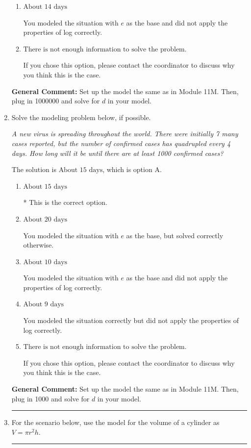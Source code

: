 \documentclass{extbook}[14pt]
\newcommand{\litem}[1]{\item #1

\rule{\textwidth}{0.4pt}}
\begin{document}
\begin{enumerate}
{\begin{enumerate}[label=\Alph*.]
You modeled the situation with $e$ as the base, but solved correctly otherwise.
\item \( \text{About } 14 \text{ days} \)

You modeled the situation with $e$ as the base and did not apply the properties of log correctly.
\item \( \text{There is not enough information to solve the problem.} \)

If you chose this option, please contact the coordinator to discuss why you think this is the case.
\end{enumerate}

\textbf{General Comment:} Set up the model the same as in Module 11M. Then, plug in 1000000 and solve for $d$ in your model.
}
\litem{
Solve the modeling problem below, if possible.

\begin{center}
    \textit{ A new virus is spreading throughout the world. There were initially 7 many cases reported, but the number of confirmed cases has quadrupled every 4 days. How long will it be until there are at least 1000 confirmed cases? }
\end{center}
The solution is \( \text{About } 15 \text{ days} \), which is option A.\begin{enumerate}[label=\Alph*.]
\item \( \text{About } 15 \text{ days} \)

* This is the correct option.
\item \( \text{About } 20 \text{ days} \)

You modeled the situation with $e$ as the base, but solved correctly otherwise.
\item \( \text{About } 10 \text{ days} \)

You modeled the situation with $e$ as the base and did not apply the properties of log correctly.
\item \( \text{About } 9 \text{ days} \)

You modeled the situation correctly but did not apply the properties of log correctly.
\item \( \text{There is not enough information to solve the problem.} \)

If you chose this option, please contact the coordinator to discuss why you think this is the case.
\end{enumerate}

\textbf{General Comment:} Set up the model the same as in Module 11M. Then, plug in 1000 and solve for $d$ in your model.
}
\litem{
For the scenario below, use the model for the volume of a cylinder as $V = \pi r^2 h$.

}
\end{enumerate}
\end{document}
